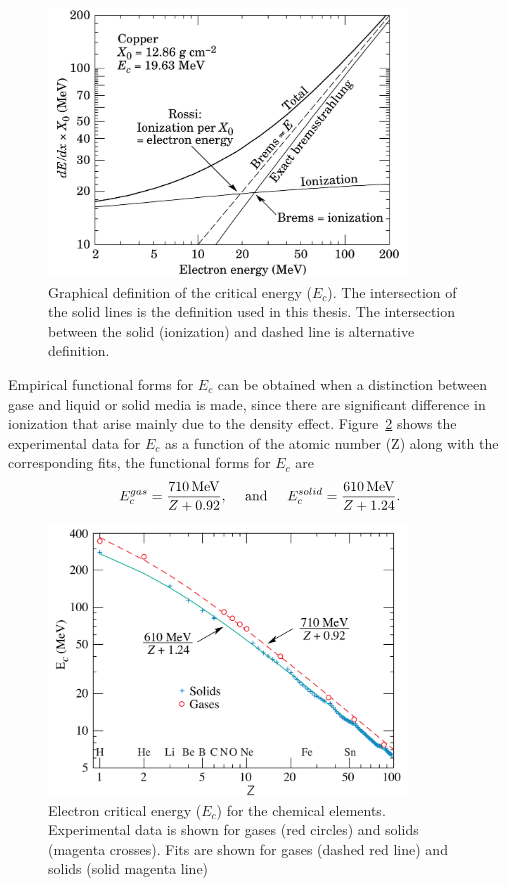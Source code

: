 \begin{figure}[h] \centering
\includegraphics[width=0.85\textwidth]{calorimetry/CriticalEnergyDefinition.pdf}
\caption{Graphical definition of the critical energy ($E_{c}$). The
  intersection of the solid lines is the definition used in this
  thesis. The intersection between the solid (ionization) and dashed
  line is alternative definition.}
\label{fig:criticalE}
\end{figure} 
Empirical functional forms for $E_{c}$ can be obtained when a
distinction between gase and liquid or solid media is made, since there are
significant difference in ionization that arise mainly due to the
density effect. Figure~\ref{fig:criticalEFF} shows the experimental
data for $E_{c}$ as a function of the atomic number (Z) along with the
corresponding fits, the functional forms for $E_{c}$ are
\begin{equation}
E^{gas}_{c} = \frac{710\,\text{Me\hspace{-.08em}V}}{Z+0.92}\mathrm{,}\hspace{0.5cm}\mathrm{and}\hspace{0.5cm}E^{solid}_{c} = \frac{610\,\text{Me\hspace{-.08em}V}}{Z+1.24}.
\end{equation}

\begin{figure}[h] \centering
\includegraphics[width=0.85\textwidth]{calorimetry/CriticalEnergy.pdf}
\caption{Electron critical energy ($E_{c}$) for the chemical
  elements. Experimental data is shown for gases (red circles) and
  solids (magenta crosses). Fits are shown for gases (dashed red line)
and solids (solid magenta line)}
\label{fig:criticalEFF}
\end{figure} 

